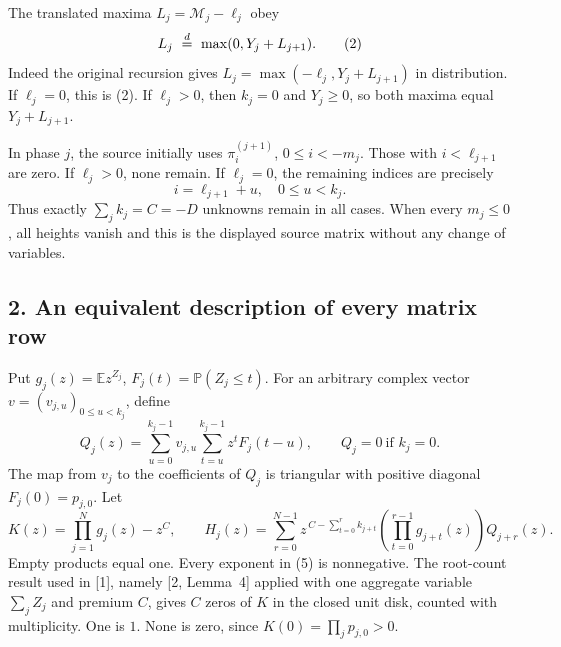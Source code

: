 \documentclass[11pt]{article}
\newcommand{\E}{\mathbb E}
\newcommand{\Pp}{\mathbb P}
\begin{document}
The translated maxima \(L_j=\mathcal M_j-\ell_j\) obey
\[
 L_j\ \buildrel d\over=\ \max(0,Y_j+L_{j+1}).
                                                               \tag{2}
\]
Indeed the original recursion gives
\(L_j=\max(-\ell_j,Y_j+L_{j+1})\) in distribution.
If \(\ell_j=0\), this is (2). If \(\ell_j>0\), then \(k_j=0\)
and \(Y_j\geq0\), so both maxima equal \(Y_j+L_{j+1}\).

In phase \(j\), the source initially uses
\(\pi^{(j+1)}_i\), \(0\leq i<-m_j\). Those with
\(i<\ell_{j+1}\) are zero. If \(\ell_j>0\), none remain.
If \(\ell_j=0\), the remaining indices are precisely
\[
 i=\ell_{j+1}+u,\quad 0\leq u<k_j.
                                                               \tag{3}
\]
Thus exactly \(\sum_jk_j=C=-D\) unknowns remain in all cases.
When every \(m_j\leq0\), all heights vanish and this is
the displayed source matrix without any change of variables.

\subsection*{2. An equivalent description of every matrix row}
Put \(g_j(z)=\E z^{Z_j}\), \(F_j(t)=\Pp(Z_j\leq t)\).
For an arbitrary complex vector \(v=(v_{j,u})_{0\leq u<k_j}\),
define
\[
 Q_j(z)=\sum_{u=0}^{k_j-1}v_{j,u}
                  \sum_{t=u}^{k_j-1}z^tF_j(t-u),
 \qquad Q_j=0\ \text{if }k_j=0.                              \tag{4}
\]
The map from \(v_j\) to the coefficients of \(Q_j\) is triangular
with positive diagonal \(F_j(0)=p_{j,0}\).
Let
\[
 K(z)=\prod_{j=1}^Ng_j(z)-z^C,
 \qquad
 H_j(z)=\sum_{r=0}^{N-1}
 z^{\,C-\sum_{t=0}^r k_{j+t}}
 \left(\prod_{t=0}^{r-1}g_{j+t}(z)\right)Q_{j+r}(z).
                                                               \tag{5}
\]
Empty products equal one. Every exponent in (5) is nonnegative.
The root-count result used in [1], namely [2, Lemma~4] applied
with one aggregate variable \(\sum_jZ_j\) and premium \(C\),
gives \(C\) zeros of \(K\) in the closed unit disk, counted with
multiplicity. One is \(1\). None is zero, since \(K(0)=\prod_jp_{j,0}>0\).
\end{document}
